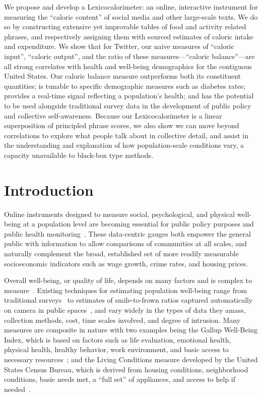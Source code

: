 \documentclass[10pt]{article}
\begin{document}
We propose and develop a Lexicocalorimeter: 
an online, interactive instrument for measuring the ``caloric
content'' of social media and other large-scale texts.
We do so by constructing extensive yet improvable
tables of food and activity related phrases,
and respectively assigning them with sourced estimates of caloric 
intake and expenditure.
We show that for Twitter, our naive measures of 
``caloric input'', ``caloric output'', and
the ratio of these measures---``caloric balance''---are all strong
correlates with health and well-being demographics for the
contiguous United States.
Our caloric balance measure outperforms both its constituent quantities;
is tunable to specific demographic measures such as diabetes rates;
provides a real-time signal reflecting a population's health;
and has the potential to be used alongside
traditional survey data in the development 
of public policy and collective self-awareness.
Because our Lexicocalorimeter is a linear superposition
of principled phrase scores,
we also show we can move beyond correlations to explore what people talk about in 
collective detail, and
assist in the understanding and explanation of how population-scale conditions vary,
a capacity unavailable to black-box type methods.


\section*{Introduction}
\label{sec:fluxwell.intro}

Online instruments designed to measure social,
psychological, and physical well-being at a population level are 
becoming essential for public policy purposes and public health monitoring~\cite{CDC2013,dodds2011e}.
These data-centric gauges both 
empower the general public with information
to allow comparisons of communities at all scales,
and naturally
complement the broad, established
set of more readily measurable socioeconomic indicators 
such as wage growth, crime rates, and housing prices.

Overall well-being, or quality of life, depends on  many factors 
and is complex to measure~\cite{diener1995}.
Existing techniques for estimating population well-being range from traditional surveys~\cite{CDC2013,gallup}
to estimates of smile-to-frown ratios captured automatically
on camera in public spaces~\cite{feelometer}, and vary widely in the types of data they amass,
collection methods, cost, time scales involved, and
degree of intrusion.
Many measures are composite in nature 
with two examples being
the Gallup Well-Being Index, 
which is based on factors such as life evaluation, emotional health, physical health,
healthy behavior, work environment, and basic access to necessary
resources~\cite{gallup};
and
the Living Conditions measure developed by the United States Census Bureau,
which is derived from housing conditions,
neighborhood conditions, basic needs met, a ``full set'' of
appliances, and access to help if needed~\cite{census}.
\end{document}
